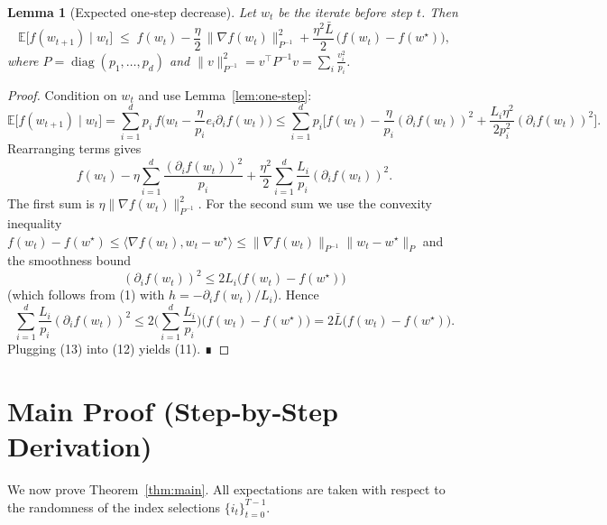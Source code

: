 \documentclass{article}
\newtheorem{lemma}{Lemma}
\newcommand{\E}{\mathbb{E}}
\newcommand{\grad}{\nabla}
\begin{document}
\begin{lemma}[Expected one‑step decrease]\label{lem:exp-descent}
Let $w_t$ be the iterate before step $t$. Then
\[
\E\!\big[f(w_{t+1})\mid w_t\big]
\;\le\;
f(w_t)-\frac{\eta}{2}\,\|\grad f(w_t)\|_{P^{-1}}^{2}
+\frac{\eta^{2}\bar L}{2}\,\big(f(w_t)-f(w^\star)\big),
\tag{11}
\]
where $P=\operatorname{diag}(p_1,\dots ,p_d)$ and $\|v\|_{P^{-1}}^{2}=v^{\top}P^{-1}v=\sum_i\frac{v_i^{2}}{p_i}$.
\end{lemma}
\begin{proof}
Condition on $w_t$ and use Lemma~\ref{lem:one-step}:
\[
\E\!\big[f(w_{t+1})\mid w_t\big]
= \sum_{i=1}^{d}p_i\,
f\!\Big(w_t-\frac{\eta}{p_i}e_i\partial_i f(w_t)\Big)
\le \sum_{i=1}^{d}p_i\Big[
f(w_t)-\frac{\eta}{p_i}(\partial_i f(w_t))^{2}
+\frac{L_i\eta^{2}}{2p_i^{2}}(\partial_i f(w_t))^{2}
\Big].
\]
Rearranging terms gives
\[
f(w_t)-\eta\sum_{i=1}^{d}\frac{(\partial_i f(w_t))^{2}}{p_i}
+\frac{\eta^{2}}{2}\sum_{i=1}^{d}\frac{L_i}{p_i}(\partial_i f(w_t))^{2}.
\tag{12}
\]
The first sum is $\eta\|\grad f(w_t)\|_{P^{-1}}^{2}$.  
For the second sum we use the convexity inequality $f(w_t)-f(w^\star)\le \langle\grad f(w_t),w_t-w^\star\rangle\le\|\grad f(w_t)\|_{P^{-1}}\|w_t-w^\star\|_{P}$ and the smoothness bound
\[
(\partial_i f(w_t))^{2}\le 2L_i\big(f(w_t)-f(w^\star)\big)
\]
(which follows from (1) with $h=-\partial_i f(w_t)/L_i$). Hence
\[
\sum_{i=1}^{d}\frac{L_i}{p_i}(\partial_i f(w_t))^{2}
\le 2\Big(\sum_{i=1}^{d}\frac{L_i}{p_i}\Big)\big(f(w_t)-f(w^\star)\big)
=2\bar L\big(f(w_t)-f(w^\star)\big).
\tag{13}
\]
Plugging (13) into (12) yields (11). ∎
\end{proof}

\section*{Main Proof (Step‑by‑Step Derivation)}
We now prove Theorem~\ref{thm:main}.  
All expectations are taken with respect to the randomness of the index selections $\{i_t\}_{t=0}^{T-1}$.
\end{document}
